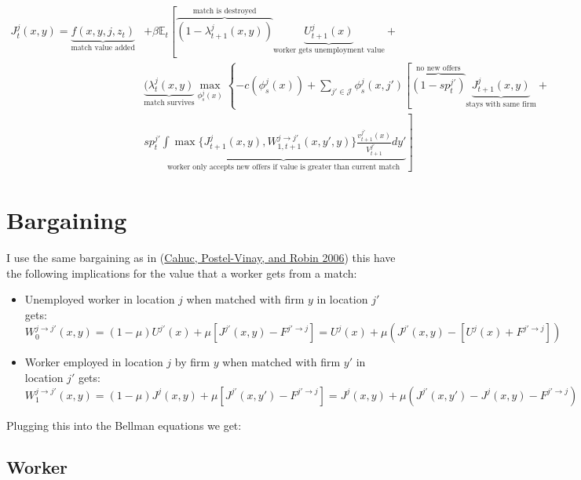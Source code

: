\documentclass[
  letterpaper,
  DIV=11,
  numbers=noendperiod]{scrartcl}
\providecommand{\tightlist}{%
  \setlength{\itemsep}{0pt}\setlength{\parskip}{0pt}}\usepackage{longtable,booktabs,array}
\begin{document}
\begin{align*}
J^j_t(x,y) = \underbrace{f(x,y,j,z_t)}_{\text{match value added}} &+ \beta\mathbb{E}_t\left[  \overbrace{ (1-\lambda^j_{t+1}(x,y)) }^{\text{match is destroyed}}\underbrace{U^{j}_{t+1}(x)}_{\text{worker gets unemployment value}} \right. + \\
  & \underbrace{(\lambda^j_t(x,y)}_{\text{match survives}} \max_{\phi_s^j(x)}\left\{-c(\phi_s^j(x)) +  \sum_{j'\in\mathcal{J}}\phi^j_s(x,j')\left[ \overbrace{(1-sp^{j'}_t)}^{\text{no new offers}} \underbrace{J^j_{t+1}(x,y)}_{\text{stays with same firm}} \right. \right. +\\
& sp^{j'}_t \left. \underbrace{\int\max\{J^{j}_{t+1}(x,y),W^{j\to j'}_{1,t+1}(x,y',y)\}\frac{v^{j'}_{t+1}(x)}{V^{j'}_{t+1}}dy'}_{\text{worker only accepts new offers if value is greater than current match}}  \right]
\end{align*}

\hypertarget{bargaining}{%
\section{Bargaining}\label{bargaining}}

I use the same bargaining as in
(\protect\hyperlink{ref-cahucWageBargainingOntheJob2006}{Cahuc,
Postel-Vinay, and Robin 2006}) this have the following implications for
the value that a worker gets from a match:

\begin{itemize}
\tightlist
\item
  Unemployed worker in location \(j\) when matched with firm \(y\) in
  location \(j'\) gets:
  \[W^{j \to j'}_{0}(x,y) = (1 - \mu) U^{j'}(x) + \mu [J^{j'}(x,y) - F^{j' \to j}] = U^{j}(x) + \mu \left(J^{j'}(x,y) - [U^{j}(x) + F^{j' \to j}]\right)\]
\item
  Worker employed in location \(j\) by firm \(y\) when matched with firm
  \(y'\) in location \(j'\) gets:
  \[W^{j \to j'}_{1}(x,y) = (1 - \mu) J^{j}(x,y) + \mu [J^{j'}(x,y') - F^{j' \to j}] = J^{j}(x,y) + \mu \left(J^{j'}(x,y') - J^{j}(x,y) - F^{j' \to j}\right)\]
\end{itemize}

Plugging this into the Bellman equations we get:

\hypertarget{worker-1}{%
\subsection{Worker}\label{worker-1}}
\end{document}
